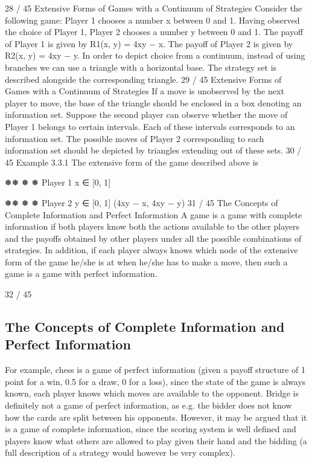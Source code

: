 28 / 45
Extensive Forms of Games with a Continuum of Strategies
Consider the following game:
Player 1 chooses a number x between 0 and 1. Having observed
the choice of Player 1, Player 2 chooses a number y between 0 and
1.
The payoff of Player 1 is given by R1(x, y) = 4xy − x. The payoff
of Player 2 is given by R2(x, y) = 4xy − y.
In order to depict choice from a continuum, instead of using
branches we can use a triangle with a horizontal base. The
strategy set is described alongside the corresponding triangle.
29 / 45
Extensive Forms of Games with a Continuum of Strategies
If a move is unobserved by the next player to move, the base of the
triangle should be enclosed in a box denoting an information set.
Suppose the second player can observe whether the move of Player
1 belongs to certain intervals. Each of these intervals corresponds
to an information set.
The possible moves of Player 2 corresponding to each information
set should be depicted by triangles extending out of these sets.
30 / 45
Example 3.3.1
The extensive form of the game described above is



❅❅
❅
❅
Player 1
x ∈ [0, 1]



❅❅
❅
❅
Player 2
y ∈ [0, 1]
(4xy − x, 4xy − y)
31 / 45
The Concepts of Complete Information and Perfect
Information
A game is a game with complete information if both players
know both the actions available to the other players and the
payoffs obtained by other players under all the possible
combinations of strategies.
In addition, if each player always knows which node of the
extensive form of the game he/she is at when he/she has to make
a move, then such a game is a game with perfect information.

32 / 45
\subsection{The Concepts of Complete Information and Perfect
Information}
For example, chess is a game of perfect information (given a payoff
structure of 1 point for a win, 0.5 for a draw, 0 for a loss), since
the state of the game is always known, each player knows which
moves are available to the opponent.
Bridge is definitely not a game of perfect information, as e.g. the
bidder does not know how the cards are split between his
opponents. However, it may be argued that it is a game of
complete information, since the scoring system is well defined and
players know what others are allowed to play given their hand and
the bidding (a full description of a strategy would however be very
complex).


